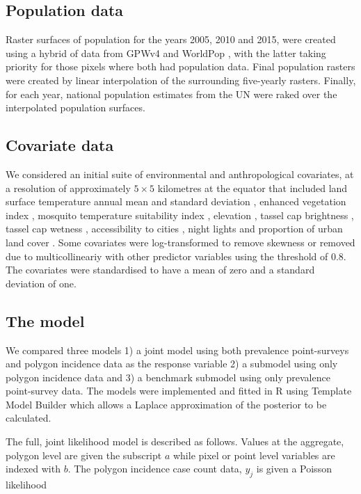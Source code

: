 \documentclass[10pt,letterpaper]{article}
\begin{document}
\subsection*{Population data}

Raster surfaces of population for the years 2005, 2010 and 2015, were created using a hybrid of data from GPWv4 \cite{gpw4} and WorldPop \cite{tatem2017worldpop}, with the latter taking priority for those pixels where both had population data. 
Final population rasters were created by linear interpolation of the surrounding five-yearly rasters.
Finally, for each year, national population estimates from the UN were raked over the interpolated population surfaces. 

\subsection*{Covariate data}

We considered an initial suite of environmental and anthropological covariates, at a resolution of approximately $5 \times 5$ kilometres at the equator that included land surface temperature annual mean and standard deviation \cite{LST}, enhanced vegetation index \cite{TCB}, mosquito temperature suitability index \cite{weiss2014air}, elevation \cite{SRTMElev}, tassel cap brightness \cite{TCB}, tassel cap wetness \cite{TCB}, accessibility to cities \cite{weiss2018global}, night lights \cite{} and proportion of urban land cover \cite{}. %
Some covariates were log-transformed to remove skewness or removed due to multicollineariy with other predictor variables using the threshold of 0.8. %
The covariates were standardised to have a mean of zero and a standard deviation of one.

\subsection*{The model}

We compared three models 1) a joint model using both  prevalence point-surveys and polygon incidence data as the response variable 2) a submodel using only polygon incidence data and 3) a benchmark submodel using only prevalence point-survey data. 
The models were implemented and fitted in R \cite{R} using Template Model Builder \cite{TMB} which allows a Laplace approximation of the posterior to be calculated.

The full, joint likelihood model is described as follows. 
Values at the aggregate, polygon level are given the subscript $a$ while pixel or point level variables are indexed with $b$.
The polygon incidence case count data, $y_j$ is given a Poisson likelihood
\end{document}
